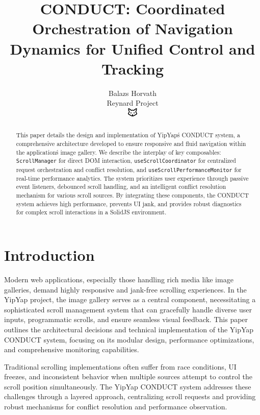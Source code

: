 \documentclass[10pt]{article}
\begin{document}
\title{CONDUCT: Coordinated Orchestration of Navigation Dynamics for Unified Control and Tracking}

\author{Balazs Horvath\\
Reynard Project\\
\includegraphics[width=0.5cm]{../../shared-assets/favicon.pdf}}

\maketitle

\begin{abstract}
This paper details the design and implementation of YipYap\'s CONDUCT system, 
a comprehensive architecture developed to ensure responsive and fluid navigation 
within the application\'s image gallery. We describe the interplay of key composables: 
\texttt{ScrollManager} for direct DOM interaction, \texttt{useScrollCoordinator} 
for centralized request orchestration and conflict resolution, and 
\texttt{useScrollPerformanceMonitor} for real-time performance analytics. 
The system prioritizes user experience through passive event listeners, 
debounced scroll handling, and an intelligent conflict resolution mechanism 
for various scroll sources. By integrating these components, the CONDUCT system 
achieves high performance, prevents UI jank, and provides robust diagnostics 
for complex scroll interactions in a SolidJS environment.
\end{abstract}

\section{Introduction}

Modern web applications, especially those handling rich media like image galleries, demand highly responsive and jank-free scrolling experiences. In the YipYap project, the image gallery serves as a central component, necessitating a sophisticated scroll management system that can gracefully handle diverse user inputs, programmatic scrolls, and ensure seamless visual feedback. This paper outlines the architectural decisions and technical implementation of the YipYap CONDUCT system, focusing on its modular design, performance optimizations, and comprehensive monitoring capabilities.

Traditional scrolling implementations often suffer from race conditions, UI freezes, and inconsistent behavior when multiple sources attempt to control the scroll position simultaneously. The YipYap CONDUCT system addresses these challenges through a layered approach, centralizing scroll requests and providing robust mechanisms for conflict resolution and performance observation.
\end{document}
